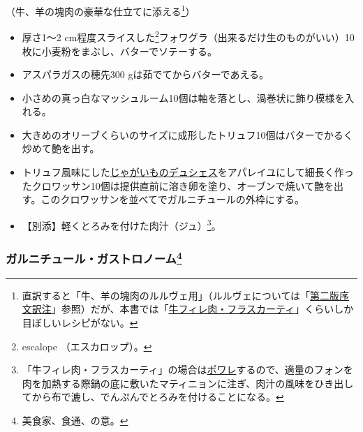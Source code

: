 \begin{recette}


（牛、羊の塊肉の豪華な仕立てに添える\footnote{直訳すると「牛、羊の塊肉のルルヴェ用」（ルルヴェについては「\protect\hyperlink{releve}{第二版序文訳注}」参照）だが、本書では「\protect\hyperlink{filet-de-boeur-frascati}{牛フィレ肉・フラスカーティ}」くらいしか目ぼしいレシピがない。}）

\begin{itemize}
\item
  厚さ1〜2 cm程度スライスした\footnote{escalope （エスカロップ）。}フォワグラ（出来るだけ生のものがいい）10枚に小麦粉をまぶし、バターでソテーする。
\item
  アスパラガスの穂先300 gは茹でてからバターであえる。
\item
  小さめの真っ白なマッシュルーム10個は軸を落とし、渦巻状に飾り模様を入れる。
\item
  大きめのオリーブくらいのサイズに成形したトリュフ10個はバターでかるく炒めて艶を出す。
\item
  トリュフ風味にした\protect\hyperlink{pommes-de-terre-duchesse}{じゃがいものデュシェス}をアパレイユにして細長く作ったクロワッサン10個は提供直前に溶き卵を塗り、オーブンで焼いて艶を出す。このクロワッサンを並べてでガルニチュールの外枠にする。
\item
  【別添】軽くとろみを付けた肉汁（ジュ）\footnote{「牛フィレ肉・フラスカーティ」の場合は\protect\hyperlink{les-poeles}{ポワレ}するので、適量のフォンを肉を加熱する際鍋の底に敷いたマティニョンに注ぎ、肉汁の風味をひき出してから布で漉し、でんぷんでとろみを付けることになる。}。
\end{itemize}

\atoaki{}

\hypertarget{garniture-a-la-gastronome}{%
\subsubsection[ガルニチュール・ガストロノーム]{\texorpdfstring{ガルニチュール・ガストロノーム\footnote{美食家、食通、の意。}}{ガルニチュール・ガストロノーム}}\label{garniture-a-la-gastronome}}




\end{recette}
